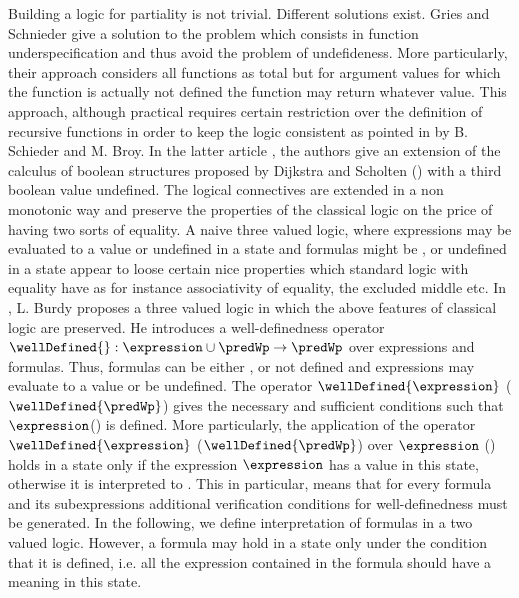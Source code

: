 Building a logic for partiality is not trivial. Different solutions exist. 
Gries and Schnieder \cite{gries95avoiding} give a solution to the problem which consists in function 
underspecification  and thus  avoid the problem of undefideness.
 More particularly, their approach considers all functions as total but for argument values for which the function is actually 
not defined the function may return whatever value. This approach, although practical requires certain restriction over the definition 
of recursive functions in order to keep the logic consistent as pointed in \cite{schieder99adapting} by 
 B. Schieder and M. Broy. In the latter article \cite{schieder99adapting}, the authors give 
  an extension  of the calculus of boolean structures proposed by Dijkstra and Scholten (\cite{WPCDS}) with a  third boolean value 
undefined.  The logical connectives are extended in a non monotonic way and preserve the properties of the classical logic
on the price  of having two sorts of equality.
A naive three valued logic, where expressions may be evaluated to a value or  undefined  in a state and
 formulas might be \false{}, \true{} or undefined in a state appear to loose certain nice properties
 which standard logic with equality have
as for instance associativity of equality, the excluded middle \cite{gries95avoiding} etc. 
In \cite{burdy98treatment}, L. Burdy proposes a three valued logic in which the above features of classical logic are preserved.
He introduces a well-definedness operator $\wellDefined{}: \expression \cup \predWp \rightarrow \predWp$
 over expressions and formulas. Thus, formulas can be either \true{}, \false{} or not defined and
expressions may evaluate to a value or be undefined. The operator  $\wellDefined{\expression}$ ($\wellDefined{\predWp}$) 
 gives the necessary and sufficient
 conditions such that $\expression$(\predWp ) is defined.
 More particularly, the application of the operator   $\wellDefined{\expression}$  ($\wellDefined{\predWp}$) over $\expression$  (\predWp ) 
 holds in a state only if the expression $\expression$ has  a value in this state, otherwise it is interpreted to \false{}.
 This in particular, means that for every formula and its subexpressions additional verification conditions for well-definedness must be generated.
 In the following, we define interpretation of formulas  in a two valued logic. However, a formula may hold in a state only under the condition that
 it is  defined, i.e. all the expression contained in the formula should have a meaning in  this state.
 
